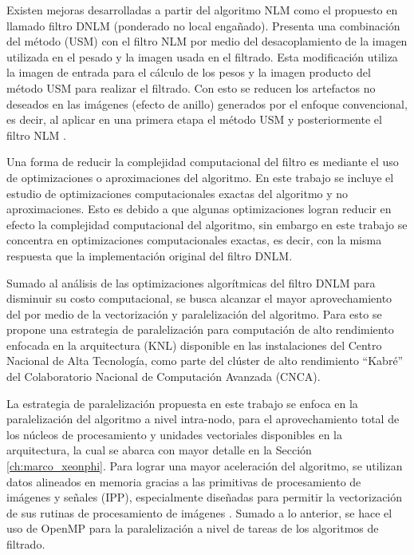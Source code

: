 Existen mejoras desarrolladas a partir del algoritmo NLM como el propuesto en \cite{calderon2015dewaff} llamado filtro DNLM  (ponderado no local enga\~nado). Presenta una combinaci\'on del m\'etodo  (USM) con el filtro NLM por medio del desacoplamiento de la imagen utilizada en el pesado y la imagen usada en el filtrado. Esta modificaci\'on utiliza la imagen de entrada para el c\'alculo de los pesos y la imagen producto del m\'etodo USM para realizar el filtrado. Con esto se reducen los artefactos no deseados en las im\'agenes (efecto de anillo) generados por el enfoque convencional, es decir, al aplicar en una primera etapa el m\'etodo USM y posteriormente el filtro NLM \cite{calderon2015dewaff}.  


Una forma de reducir la complejidad computacional del filtro es mediante el uso de optimizaciones o aproximaciones del algoritmo. En este trabajo se incluye el estudio de optimizaciones computacionales exactas del algoritmo y no aproximaciones. Esto es debido a que algunas optimizaciones logran reducir en efecto la complejidad computacional del algoritmo, sin embargo en este trabajo se concentra en optimizaciones computacionales exactas, es decir, con la misma respuesta que la implementaci\'on original del filtro DNLM. 

Sumado al an\'alisis de las optimizaciones algor\'itmicas del filtro DNLM para disminuir su costo computacional, se busca alcanzar el mayor aprovechamiento del  por medio de la vectorizaci\'on y paralelizaci\'on del algoritmo. Para esto se propone una estrategia de paralelizaci\'on para computaci\'on de alto rendimiento enfocada en la arquitectura  (KNL) disponible en las instalaciones del Centro Nacional de Alta Tecnolog\'ia, como parte del cl\'uster de alto rendimiento ``Kabr\'e'' del Colaboratorio Nacional de Computaci\'on Avanzada (CNCA).

La estrategia de paralelizaci\'on propuesta en este trabajo se enfoca en la paralelizaci\'on del algoritmo a nivel intra-nodo, para el aprovechamiento total de los n\'ucleos de procesamiento y unidades vectoriales disponibles en la arquitectura, la cual se abarca con mayor detalle en la Secci\'on \ref{ch:marco_xeonphi}. 
Para lograr una mayor aceleraci\'on del algoritmo, se utilizan datos alineados en memoria gracias a las primitivas de procesamiento de im\'agenes y se\~nales  (IPP), especialmente dise\~nadas para permitir la vectorizaci\'on de sus rutinas de procesamiento de im\'agenes \cite{IntelCorporation2017}. Sumado a lo anterior, se hace el uso de OpenMP para la paralelizaci\'on a nivel de tareas de los algoritmos de filtrado. 

